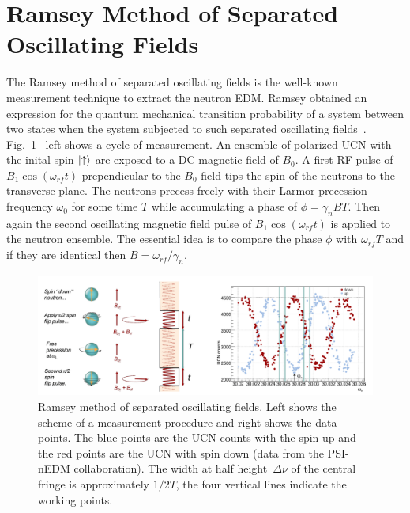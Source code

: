 \section{Ramsey Method of Separated Oscillating
  Fields\label{sec:Ramsey}}

The Ramsey method of separated oscillating fields is the well-known
measurement technique to extract the neutron EDM. Ramsey obtained an
expression for the quantum mechanical transition probability of a
system between two states when the system subjected to such separated
oscillating
fields~\cite{ramsey1950}. Fig.~\ref{fig:ramsey}~\cite{Schmidt2016} left
shows a cycle of measurement. An ensemble of polarized UCN with the
inital spin $\ket{ \uparrow}$ are exposed to a DC magnetic field of
$B_0$.  A first RF pulse of $B_1 \cos (\omega_{rf}t)$ prependicular to
the $B_0$ field tips the spin of the neutrons to the transverse
plane. The neutrons precess freely with their Larmor precession
frequency $\omega_0$ for some time $T$ while accumulating a phase of
$\phi = \gamma_n BT$. Then again the second oscillating magnetic field
pulse of $B_1 \cos (\omega_{rf}t)$ is applied to the neutron
ensemble. The essential idea is to compare the phase $\phi$ with
$\omega_{rf}T$ and if they are identical then
$B= \omega_{rf} / \gamma_n$.

\begin{figure}[h]
  \centering
  \includegraphics[width=1.0\textwidth]{ramsey.png}
  \caption{Ramsey method of separated oscillating fields. Left shows
    the scheme of a measurement procedure and right shows the data
    points. The blue points are the UCN counts with the spin up and
    the red points are the UCN with spin down (data from the PSI-nEDM
    collaboration). The width at half height~$\Delta \nu$ of the
    central fringe is approximately $1/2T$, the four vertical lines
    indicate the working points.}
  \label{fig:ramsey}
\end{figure}

